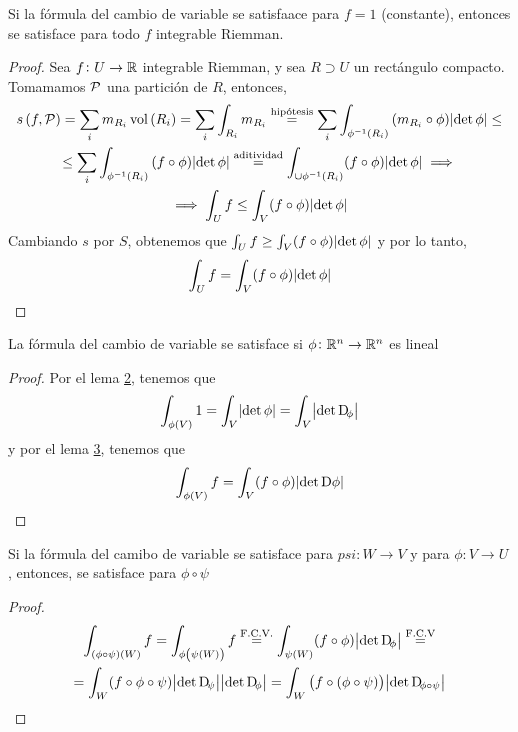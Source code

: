 \begin{lema*}[3]\label{lema:tres_cambio}
    Si la fórmula del cambio de variable se satisfaace para $f = 1$ (constante), entonces se satisface para todo $f$ integrable Riemman.
\end{lema*}

\begin{proof}
    Sea $f \colon U \to \mathbb{R}$ integrable Riemman, y sea $R \supset U$ un rectángulo compacto. Tomamamos $\mathcal{P}$ una partición de $R$, entonces,
    \begin{gather*}
        s\left( f, \mathcal{P} \right) = \sum_i m_{R_i} \operatorname{vol}\left( R_i \right) = \sum_{i} \int_{R_i} m_{R_i} \stackrel{\text{hipótesis}}{=}
        \sum_i \int_{\phi^{-1}\left( R_i \right)} \left( m_{R_i} \circ \phi \right)\abs{\det\phi} \leq \\ \leq
        \sum_i \int_{\phi^{-1}\left( R_i \right)} \left( f \circ \phi \right) \abs{\det\phi} \stackrel{\text{aditividad}}{=}
        \int_{\cup \phi^{-1}\left( R_i \right)} (f \circ \phi) \abs{\det \phi} \implies \\ \implies
        \int_U f \leq \int_V (f \circ \phi) \abs{\det \phi}
    \end{gather*}
    Cambiando $s$ por $S$, obtenemos que $\int_U f \geq \int_V (f \circ \phi) \abs{\det\phi}$ y por lo tanto,
    \[
        \int_U f = \int_V (f \circ \phi) \abs{\det \phi} 
    \]
\end{proof}

\begin{lema*}[4]\label{lema:cuatro_cambio}
    La fórmula del cambio de variable se satisface si $\phi \colon \mathbb{R}^n \to \mathbb{R}^n$ es lineal
\end{lema*}
\begin{proof}
    Por el lema \hyperref[lema:dos_cambio]{2}, tenemos que
    \[
        \int_{\phi(V)} 1 = \int_V \abs{\det \phi} = \int_V \abs{\det \Dif_\phi}
    \]
    y por el lema \hyperref[lema:tres_cambio]{3}, tenemos que
    \[
        \int_{\phi(V)} f = \int_V (f \circ \phi) \abs{\det \Dif \phi}
    \]
\end{proof}

\begin{lema*}[5]\label{lema:cinco_cambio}
    Si la fórmula del camibo de variable se satisface para $psi \colon W \to V$ y para $\phi \colon V \to U$, entonces, se satisface para
    $\phi \circ \psi$
\end{lema*}

\begin{proof}
    \begin{gather*}
        \int_{(\phi \circ \psi)(W)} f = \int_{\phi\left( \psi(W) \right)} f \stackrel{\text{F.C.V.}}{=} \int_{\psi(W)} (f \circ \phi)
        \abs{\det \Dif_\phi} \stackrel{\text{F.C.V}}{=} \\ = \int_W (f \circ \phi \circ \psi) \abs{\det \Dif_\psi} \abs{\det \Dif_\phi} =
        \int_W \left( f \circ ( \phi \circ \psi) \right) \abs{\det \Dif_{\phi \circ \psi}}
    \end{gather*}
\end{proof}

